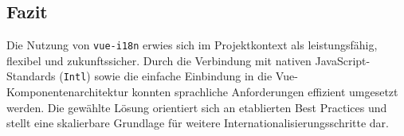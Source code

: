 \subsection{Fazit}
Die Nutzung von \texttt{vue-i18n} erwies sich im Projektkontext als leistungsfähig, flexibel und zukunftssicher. Durch die Verbindung mit nativen JavaScript-Standards (\texttt{Intl}) sowie die einfache Einbindung in die Vue-Komponentenarchitektur konnten sprachliche Anforderungen effizient umgesetzt werden. Die gewählte Lösung orientiert sich an etablierten Best Practices und stellt eine skalierbare Grundlage für weitere Internationalisierungsschritte dar.


